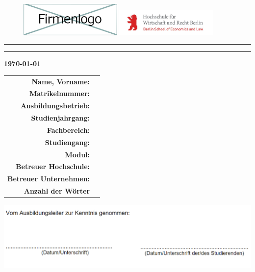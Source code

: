 \begin{titlepage}
	\begin{figure}[ht!]
		\includegraphics[width=0.45\textwidth]{img/unternehmen_header_logo.png} \hfill
		\includegraphics[width=0.45\textwidth]{img/hwr_header_logo.png}
	\end{figure}
	\vspace{20pt}
	\centering \textbf{\huge \zTyp}
	\normalfont\endgraf\rule{\textwidth}{.4pt}\endgraf{}
	\begingroup
		\centering
		\linespread{2.5}
		\huge\zTitel{}
	\endgroup
	\linespread{1.5}
	\endgraf\rule{\textwidth}{.4pt}
	\hfill
	\begin{center}
		\textbf{\today}
		\endgraf{}
	\end{center}
	\begin{tabular}{rl}
		\textbf{\normalsize{Name, Vorname:}}        & \normalsize{\zStudent} \\
		\textbf{\normalsize{Matrikelnummer:}}       & \normalsize{\zMatrikelnr} \\
		\textbf{\normalsize{Ausbildungsbetrieb:}}   & \normalsize{\zBetrieb} \\
		\textbf{\normalsize{Studienjahrgang:}}      & \normalsize{\zJahrgang} \\
		\textbf{\normalsize{Fachbereich:}}          & \normalsize{\zFachbereich} \\
		\textbf{\normalsize{Studiengang:}}          & \normalsize{\zStudiengang} \\
		\textbf{\normalsize{Modul:}}                & \normalsize{\zModul} \\
		\textbf{\normalsize{Betreuer Hochschule:}}  & \normalsize{\zBetreuerHs} \\
		\textbf{\normalsize{Betreuer Unternehmen:}} & \normalsize{\zBetreuerUn} \\
		\textbf{\normalsize{Anzahl der Wörter}}     & \normalsize{\zAnzahlWoerter} \\
	\end{tabular}
	\endgraf{}
	\vspace{50pt}
	\includegraphics[scale=0.45]{img/ptb-signature.png}
\end{titlepage}